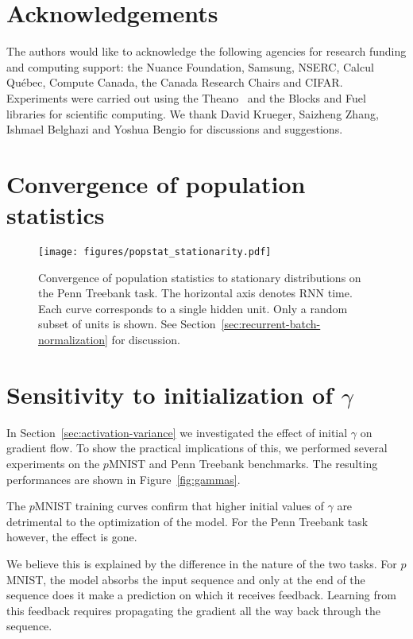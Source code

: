 \documentclass{article} \pdfoutput=1 \usepackage[utf8]{inputenc}
\begin{document}
\section*{Acknowledgements}

The authors would like to acknowledge the following agencies for
research funding and computing support: the Nuance Foundation, Samsung, NSERC, Calcul Qu\'{e}bec, Compute Canada,
the Canada Research Chairs and CIFAR.
Experiments were carried out using the Theano~\citep{theano} and the
Blocks and Fuel~\citep{blocks} libraries for scientific computing.
We thank David Krueger, Saizheng Zhang, Ishmael Belghazi and Yoshua Bengio for discussions and suggestions.




\newpage

\appendix

\section{Convergence of population statistics} \label{sec:popstat_stationarity}

\begin{figure}[!h]
\center
\texttt{[image: figures/popstat\_stationarity.pdf]}
\caption{Convergence of population statistics to stationary distributions on the 
Penn Treebank task. The horizontal axis denotes RNN time. Each curve corresponds to a single hidden unit. Only a random subset of units is shown.
See Section~\ref{sec:recurrent-batch-normalization} for discussion.}
\label{fig:popstat_stationarity}
\end{figure}

\section{Sensitivity to initialization of $\gamma$}

In Section~\ref{sec:activation-variance} we investigated the effect of initial $\gamma$ on gradient flow.
To show the practical implications of this, we performed several experiments on the $p$MNIST and Penn Treebank benchmarks.
The resulting performances are shown in Figure~\ref{fig:gammas}.

The $p$MNIST training curves confirm that higher initial values of $\gamma$ are detrimental to the optimization of the model.
For the Penn Treebank task however, the effect is gone.

We believe this is explained by the difference in the nature of the two tasks.
For $p$MNIST, the model absorbs the input sequence and only at the end of the sequence does it make a prediction on which it receives feedback.
Learning from this feedback requires propagating the gradient all the way back through the sequence.
\end{document}
